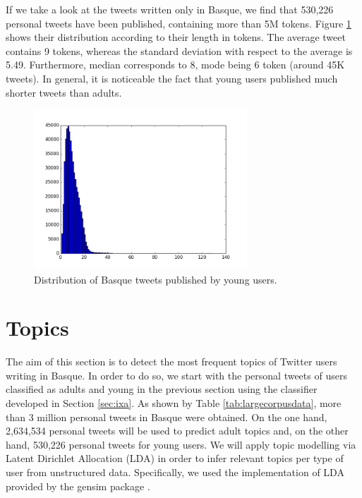 \documentclass[information,article,submit,moreauthors,pdftex,10pt,a4paper]{Definitions/mdpi}
\begin{document}
If we take a look at the tweets written only in Basque, we find that 530,226 personal tweets have been published, containing more than 5M tokens. Figure  \ref{fig:txio luze gzt} shows their distribution according to their length in tokens. The average tweet contains 9 tokens, whereas the standard deviation with respect to the average is 5.49. Furthermore, median corresponds to 8, mode being 6 token (around 45K tweets). In general, it is noticeable the fact that young users published much shorter tweets than adults.

\begin{figure}[H]
  \centering
  \includegraphics[height=6cm]{graf_inf}
  \caption{Distribution of Basque tweets published by young users.}
  \label{fig:txio luze gzt}
\end{figure}



\section{Topics}\label{sec:topics}

The aim of this section is to detect the most frequent topics of Twitter users writing in Basque. In order to do so, we start with the personal tweets of users classified as adults and young in the previous section using the classifier developed in Section \ref{sec:ixa}. As shown by Table \ref{tab:largecorpusdata}, more than 3 million personal tweets in Basque were obtained. On the one hand, 2,634,534 personal tweets will be used to predict adult topics and, on the other hand, 530,226 personal tweets for young users. We will apply topic modelling via Latent Dirichlet Allocation (LDA) \cite{blei2003latent} in order to infer relevant topics per type of user from unstructured data. Specifically, we used the implementation of LDA provided by the gensim package \cite{rehurek2010software}.
\end{document}
